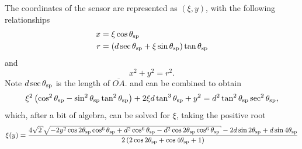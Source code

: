 The coordinates of the sensor are represented as $(\xi,y)$, with the
following relationships
\begin{align}
x &= \xi \cos \theta_\mathrm{sp} \label{eqn:conic01a} \\
r &= \left(d \sec \theta_\mathrm{sp} + \xi \sin \theta_\mathrm{sp}\right) \tan\theta_\mathrm{sp} \label{eqn:conic01b}
\end{align}
and
\begin{equation}
x^2+y^2=r^2.
\label{eqn:conic01c}
\end{equation}
Note $d \sec\theta_\mathrm{sp}$ is the length of $\overline{OA}$.
 and  can be combined to obtain
\begin{equation}
\xi^2 \left(\cos ^2\theta_\mathrm{sp}-\sin ^2\theta_\mathrm{sp} \tan
^2\theta_\mathrm{sp}\right)+2 \xi d \tan ^3\theta_\mathrm{sp}+y^2=d^2 \tan
^2\theta_\mathrm{sp} \sec ^2\theta_\mathrm{sp},
\end{equation}
which, after a bit of algebra, can be solved for $\xi$, taking
the positive root
\begin{equation}
\xi(y) = \frac{4 \sqrt{2} \sqrt{-2 y^2 \cos 2 \thetasp  \cos ^6\thetasp +d^2
\cos ^6\thetasp -d^2 \cos 2 \thetasp  \cos^6\thetasp}-2 d \sin 2 \thetasp
+d \sin 4 \thetasp }{2 \left(2 \cos 2 \thetasp +\cos 4 \thetasp +1\right)}
\label{eqn:conic02}
\end{equation}

